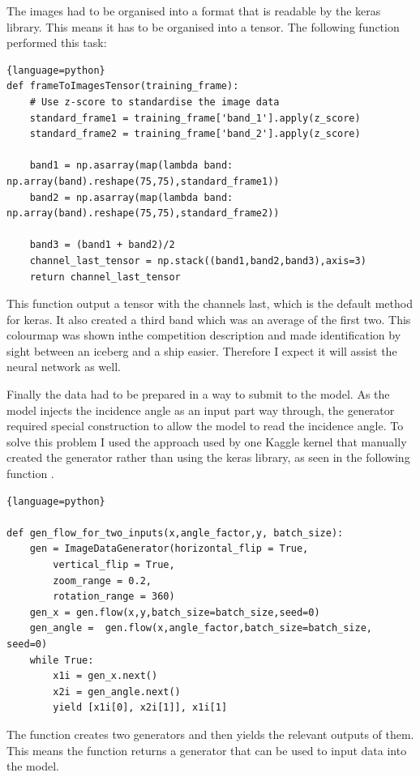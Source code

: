 \documentclass{article}
\begin{document}
The images had to be organised into a format that is readable by the keras library. This means it has to be organised into a tensor. The following function performed this task:
\begin{lstlisting}{language=python}
def frameToImagesTensor(training_frame):
    # Use z-score to standardise the image data
    standard_frame1 = training_frame['band_1'].apply(z_score)
    standard_frame2 = training_frame['band_2'].apply(z_score)

    band1 = np.asarray(map(lambda band: np.array(band).reshape(75,75),standard_frame1))
    band2 = np.asarray(map(lambda band: np.array(band).reshape(75,75),standard_frame2))
    
    band3 = (band1 + band2)/2
    channel_last_tensor = np.stack((band1,band2,band3),axis=3)
    return channel_last_tensor
\end{lstlisting}
This function output a tensor with the channels last, which is the default method for keras. It also created a third band which was an average of the first two. This colourmap was shown inthe competition description and made identification by sight between an iceberg and a ship easier. Therefore I expect it will assist the neural network as well. 

Finally the data had to be prepared in a way to submit to the model. As the model injects the incidence angle as an input part way through, the generator required special construction to allow the model to read the incidence angle. To solve this problem I used the approach used by one Kaggle kernel that manually created the generator rather than using the keras library, as seen in the following function \cite{angle-inject-kernel}. 
\begin{lstlisting}{language=python}

def gen_flow_for_two_inputs(x,angle_factor,y, batch_size):
    gen = ImageDataGenerator(horizontal_flip = True,
    	vertical_flip = True,
    	zoom_range = 0.2,
    	rotation_range = 360)
    gen_x = gen.flow(x,y,batch_size=batch_size,seed=0)
    gen_angle =  gen.flow(x,angle_factor,batch_size=batch_size, seed=0)
    while True:
        x1i = gen_x.next()
        x2i = gen_angle.next()
        yield [x1i[0], x2i[1]], x1i[1]
\end{lstlisting}
The function creates two generators and then yields the relevant outputs of them. This means the function returns a generator that can be used to input data into the model. 
\end{document}
